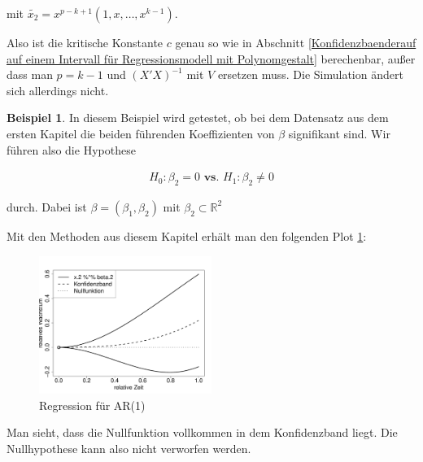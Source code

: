 \documentclass[12pt,a4paper]{article}
\theoremstyle{definition}
\newtheorem{Beispiel}[Definition]{Beispiel}
\theoremstyle{definition}
\theoremstyle{definition}
\theoremstyle{definition}
\begin{document}
mit $\tilde{x_2}= x^{p-k+1}(1, x, \ldots, x^{k-1})$.

Also ist die kritische Konstante $c$ genau so wie in Abschnitt \ref{Konfidenzbaenderauf auf einem Intervall für Regressionsmodell mit Polynomgestalt} berechenbar, außer dass man $p=k-1$ und $(X'X)^{-1}$ mit $V$ ersetzen muss. Die Simulation ändert sich allerdings nicht.

\begin{Beispiel}
In diesem Beispiel wird getestet, ob bei dem Datensatz aus dem ersten Kapitel die beiden führenden Koeffizienten von $\beta$ signifikant sind. Wir führen also die Hypothese

\begin{align*}
H_{0} : \beta_{2} = 0  \textbf{ vs. }  H_{1} : \beta_{2} \neq 0
\end{align*}

durch. Dabei ist $\beta = (\beta_{1}, \beta_{2})$ mit $\beta_2 \subset \mathbb{R}^2$ 

Mit den Methoden aus diesem Kapitel erhält man den folgenden Plot \ref{Bsp-KB-nested}:

\begin{figure}[H] 
  \centering
     \includegraphics[width=0.5\textwidth]{Bsp-KB-nested}
  \caption{Regression für AR(1)}
  \label{Bsp-KB-nested}
\end{figure}

Man sieht, dass die Nullfunktion vollkommen in dem Konfidenzband liegt. Die Nullhypothese kann also nicht verworfen werden.
\end{Beispiel}
\end{document}
